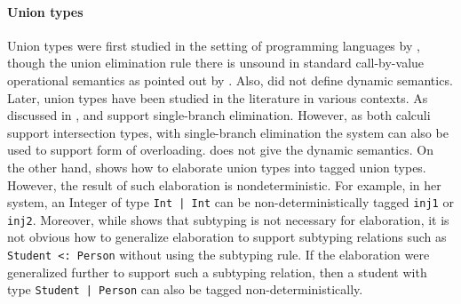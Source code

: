 \paragraph{Union types}
\begin{comment}
Set-theoretic unions have sound theory and extensively studied in
mathematics. Set-theoretic unions correspond to union types or
disjoint union types in programming languages. Disjoint union types
are also called sum types or variants.  Constructors are explicitly
labeled in disjoint union types and expressions are manipulated using
corresponding labels. Few other interesting calculi (and this paper)
do not use labels and provide type-based union elimination.
\end{comment}
Union types were first studied in the setting of programming languages by
\citet{macqueen1984ideal}, though the union elimination rule there is unsound in
standard call-by-value operational semantics as pointed out by
\cite{dunfield2003type}. Also, \citet{macqueen1984ideal} did not define dynamic
semantics. Later, union types have been studied in the literature in various
contexts. As discussed in ,
\citet{pierce1991programming} and \cite{dunfield2014elaborating} support
single-branch elimination. However, as both calculi support intersection types,
with single-branch elimination the system can also be used to support form of
overloading. \cite{pierce1991programming} does not give the dynamic semantics.
On the other hand, \cite{dunfield2014elaborating} shows how to elaborate union
types into tagged union types. However, the result of such elaboration is
nondeterministic. For example, in her system, an Integer of type \lstinline{Int | Int}
can be non-deterministically tagged \lstinline{inj1} or
\lstinline{inj2}. Moreover, while \citet{dunfield2014elaborating} shows that
subtyping is not necessary for elaboration, it is not obvious how to generalize
elaboration to support subtyping relations such as
\lstinline{Student <: Person} without using the subtyping rule. If the
elaboration were generalized further to support such a subtyping relation, then
a student with type \lstinline{Student | Person} can also be tagged
non-deterministically.



